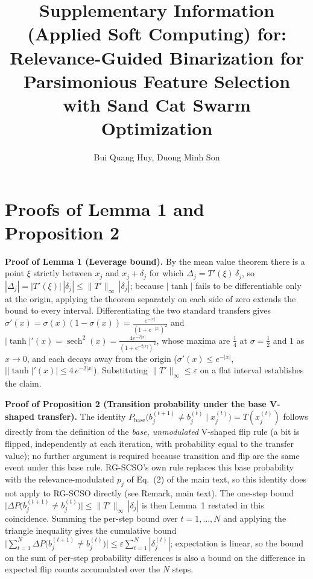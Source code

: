 \documentclass[9pt]{article}
\title{Supplementary Information (Applied Soft Computing) for: Relevance-Guided Binarization for
Parsimonious Feature Selection with Sand Cat Swarm Optimization}
\author{Bui Quang Huy, Duong Minh Son}
\date{}
\begin{document}
\maketitle

\FloatBarrier
\section{Proofs of Lemma 1 and Proposition 2}
\textbf{Proof of Lemma 1 (Leverage bound).} By the mean value theorem
there is a point $\xi$ strictly between $x_j$ and $x_j+\delta_j$ for which
$\Delta_j=T'(\xi)\,\delta_j$, so
$|\Delta_j|=|T'(\xi)|\,|\delta_j|\le\|T'\|_\infty\,|\delta_j|$; because
$|\tanh|$ fails to be differentiable only at the origin, applying the
theorem separately on each side of zero extends the bound to every
interval. Differentiating the two standard transfers gives
$\sigma'(x)=\sigma(x)(1-\sigma(x))=\tfrac{e^{-|x|}}{(1+e^{-|x|})^2}$ and
$|\tanh|'(x)=\operatorname{sech}^2(x)=\tfrac{4e^{-2|x|}}{(1+e^{-2|x|})^2}$,
whose maxima are $\tfrac14$ at $\sigma=\tfrac12$ and $1$ as $x\to0$, and
each decays away from the origin ($\sigma'(x)\le e^{-|x|}$,
$\big||\tanh|'(x)\big|\le 4\,e^{-2|x|}$). Substituting
$\|T'\|_\infty\le\varepsilon$ on a flat interval establishes the claim.

\textbf{Proof of Proposition 2 (Transition probability under the base
V-shaped transfer).} The identity $P_{\text{base}}\big(b_j^{(t+1)}\ne
b_j^{(t)}\mid
x_j^{(t)}\big)=T(x_j^{(t)})$ follows directly from the definition of the
\emph{base, unmodulated} V-shaped flip rule (a bit is flipped, independently
at each iteration, with probability equal to the transfer value); no further
argument is required because transition and flip are the same event under
this base rule. RG-SCSO's own rule replaces this base probability with the
relevance-modulated $p_j$ of Eq.~(2) of the main text, so this identity does
not apply to RG-SCSO directly (see Remark, main text). The
one-step bound $\big|\Delta P\big(b_j^{(t+1)}\ne b_j^{(t)}\big)\big|\le
\|T'\|_\infty\,|\delta_j|$ is then Lemma~1 restated in this coincidence.
Summing the per-step bound over $t=1,\dots,N$ and applying the triangle
inequality gives the cumulative bound
$\big|\sum_{t=1}^{N}\Delta P\big(b_j^{(t+1)}\ne b_j^{(t)}\big)\big|\le
\varepsilon\sum_{t=1}^{N}|\delta_j^{(t)}|$; expectation is linear, so the
bound on the sum of per-step probability differences is also a bound on
the difference in expected flip counts accumulated over the $N$ steps.
\end{document}

